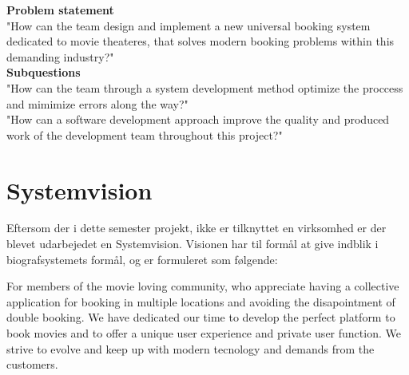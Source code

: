 \textbf{Problem statement} \\
"How can the team design and implement a new universal booking system dedicated to movie theateres, 
that solves modern booking problems within this demanding industry?" \\

\textbf{Subquestions} \\
"How can the team through a system development method optimize the proccess and mimimize errors along the way?" \\

"How can a software development approach improve the quality and produced work of the development team throughout this project?"

\section{Systemvision}
Eftersom der i dette semester projekt, ikke er tilknyttet en virksomhed er der blevet udarbejedet en Systemvision.
Visionen har til formål at give indblik i biografsystemets formål, og er formuleret som følgende:

For members of the movie loving community, who appreciate having a collective application for booking 
in multiple locations and avoiding the disapointment of double booking. We have dedicated our 
time to develop the perfect platform to book movies and to offer a unique user experience and private user function. 
We strive to evolve and keep up with modern tecnology and demands from the customers. \\



